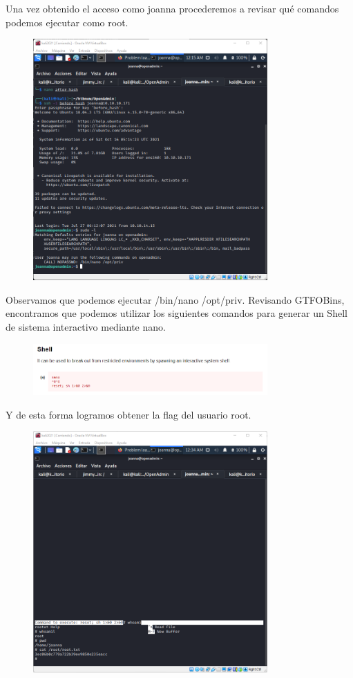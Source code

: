 \documentclass{article}
\begin{document}
Una vez obtenido el acceso como joanna procederemos a revisar qué comandos podemos ejecutar como root.
\begin{figure}[h]
	\center
	\includegraphics[width=0.8\textwidth]{images/openadmin/18-sudol.png}
	\caption{}
\end{figure}

Observamos que podemos ejecutar /bin/nano /opt/priv. Revisando GTFOBins, encontramos que podemos utilizar los siguientes comandos para generar un Shell de sistema interactivo mediante nano.
\begin{figure}[h]
	\center
	\includegraphics[width=0.8\textwidth]{images/openadmin/19-gtfobins.png}
	\caption{}
\end{figure}

Y de esta forma logramos obtener la flag del usuario root.
\begin{figure}[h]
	\center
	\includegraphics[width=0.8\textwidth]{images/openadmin/20-privilegio.png}
	\caption{}
\end{figure}
\end{document}

